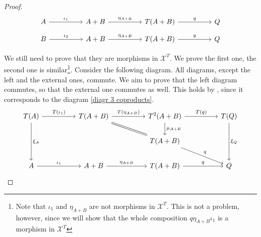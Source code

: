 \begin{subbox}{}
\begin{proof}
        \begin{minipage}{\textwidth}
        \[
\begin{tikzcd}
A \arrow[rr, "\iota_1"] &  & A+B \arrow[rr, "\eta_{A+B}"] &  & T(A+B) \arrow[rr, "q"] &  & Q
\end{tikzcd}
\]
\[
\begin{tikzcd}
B \arrow[rr, "\iota_2"] &  & A+B \arrow[rr, "\eta_{A+B}"] &  & T(A+B) \arrow[rr, "q"] &  & Q
\end{tikzcd}
\]
\end{minipage}
        We still need to prove that they are morphisms in $\mathcal{X}^T$. We prove the first one, the second one is similar\footnote{Note that $\iota_1$ and $\eta_{A+B}$ are not morphisms in $\mathcal{X}^T$. This is not a problem, however, since we will show that the whole composition $q\eta_{A+B}\iota_1$ is a morphism in $\mathcal{X}^T$}. Consider the following diagram. All diagrams, except the left and the external ones, commute. We aim to prove that the left diagram commutes, so that the external one commutes as well. This holds by , since it corresponds to the diagram \eqref{diagr 3 coproducts}.
        \[
\begin{tikzcd}
T(A) \arrow[dd, "\xi_A"] \arrow[rr, "T(\iota_1)"] &  & T(A+B) \arrow[rr, "T(\eta_{A+B})"] \arrow[rrd, equal] &  & T^2(A+B) \arrow[d, "\mu_{A+B}"] \arrow[rr, "T(q)"] &  & T(Q) \arrow[dd, "\xi_Q"] \\
                                                  &  &                                                               &  & T(A+B) \arrow[rrd, "q"]                            &  &                          \\
A \arrow[rr, "\iota_1"]                           &  & A+B \arrow[rr, "\eta_{A+B}"]                                  &  & T(A+B) \arrow[rr, "q"]                             &  & Q                       
\end{tikzcd}
        \]


\end{proof}
\end{subbox}
